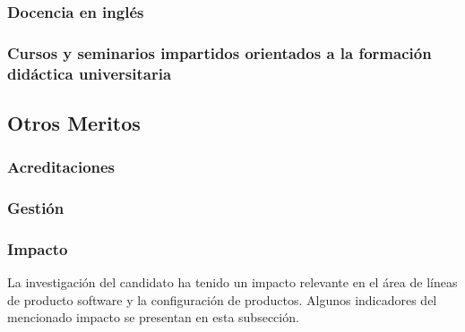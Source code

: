 \subsubsection{Docencia en inglés}

\subsubsection{Cursos y seminarios impartidos orientados a la formación didáctica universitaria}


 
\subsection{Otros Meritos}

\subsubsection{Acreditaciones}
\startitems
{}
\stopitems


\subsubsection{Gestión}
\startitems
{}
\stopitems

\subsubsection{Impacto}
La investigación del candidato ha tenido un impacto relevante en el área de líneas de producto software y la configuración de productos. Algunos indicadores del mencionado impacto se presentan en esta subsección.\\
 
\startitems
{}
\stopitems